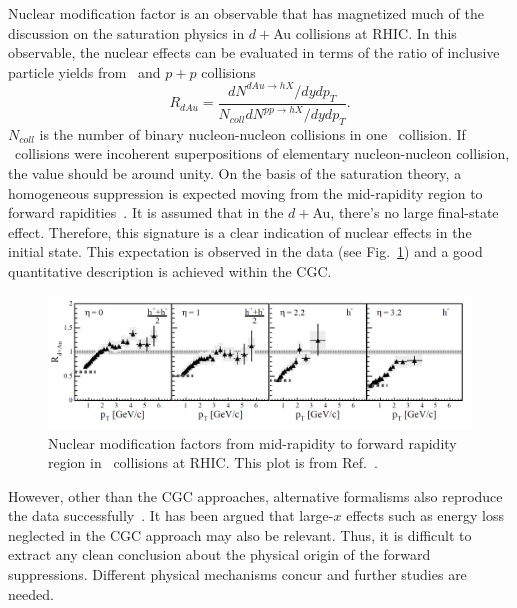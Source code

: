 Nuclear modification factor is an observable that has magnetized much of the
discussion on the saturation physics in $d+$Au collisions at RHIC. In this observable, the nuclear effects can be evaluated in terms of
the ratio of inclusive particle yields from \dA\ and $p+p$ collisions
\begin{equation} R_{dAu}=\frac{dN^{dAu\rightarrow
hX}/dydp_{T}}{N_{coll}dN^{pp\rightarrow hX}/dydp_{T}}. 
\end{equation} 
$N_{coll}$ is the number of binary nucleon-nucleon collisions in one \dA\
collision. If \dA\ collisions were incoherent superpositions of elementary
nucleon-nucleon collision, the value should be around unity. On the basis of the
saturation theory, a homogeneous suppression is expected moving from the mid-rapidity
region to forward rapidities~\cite{Albacete:2014fwa}. It is assumed that in the
$d+$Au, there's no large final-state effect. Therefore,
this signature is a clear indication of nuclear effects in the initial state.
This expectation is observed in the data (see Fig.~\ref{fig:fwd_single_dAu}) and
a good quantitative description is achieved within the CGC.
\begin{figure}
\centering
\includegraphics[width=1.0\textwidth]{plots/chpt3/fwd_single_dAu.png}
\caption[Nuclear modification factors in $d+$Au]{
Nuclear modification factors from mid-rapidity to forward rapidity region in \dA\ collisions at RHIC. This plot is from Ref.~\cite{Arsene:2004ux}.}
\label{fig:fwd_single_dAu}
\end{figure}
However, other than the CGC approaches, alternative formalisms also reproduce
the data successfully~\cite{Kopeliovich:2005ym}. It has been argued that large-$x$
effects such as energy loss neglected in the CGC approach may also be relevant.
Thus, it is difficult to extract any clean conclusion about the physical origin
of the forward suppressions. Different physical mechanisms concur and further studies
are needed.


